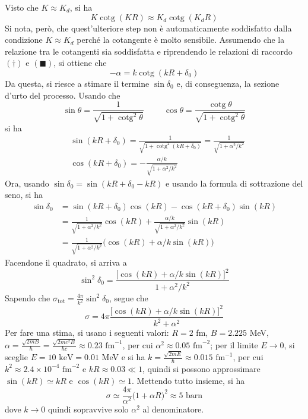 \documentclass[11pt, a4paper]{scrartcl}
\theoremstyle{style}
\numberwithin{equation}{subsection}
\begin{document}
\noindent Visto che $K \approx K_d$, si ha
\[
K \operatorname{cotg}  (K R)\approx K_d \operatorname{cotg} (K_dR)
\] 
Si nota, per\`o, che quest'ulteriore step non \`e automaticamente soddisfatto dalla condizione $K \approx K_d$ perch\'e la cotangente \`e molto sensibile.
Assumendo che la relazione tra le cotangenti sia soddisfatta e riprendendo le relazioni di raccordo $(\dagger )$ e $(\blacksquare)$, si ottiene che 
\begin{equation}
	- \alpha  = k \operatorname{cotg} (kR+\delta _0) \tag{$\star$}
\end{equation}
Da questa, si riesce a stimare il termine $\sin \delta _0$ e, di conseguenza, la sezione d'urto del processo.
Usando che
\[
\sin \theta  = \frac{1}{\sqrt{1 + \operatorname{cotg}^2 \theta  } } \hspace{1cm} \cos \theta  = \frac{\operatorname{cotg}\theta  }{\sqrt{1 + \operatorname{cotg}^2 \theta  } }
\] 
si ha
\[
	\begin{split}
		&\sin (kR +\delta _0) = \frac{1}{\sqrt{1 + \operatorname{cotg}^2 (kR+\delta _0) } } =  \frac{1}{\sqrt{1+ \alpha ^2 / k^2} }\\
		&\cos (kR +\delta _0) =- \frac{\alpha  / k}{\sqrt{1 + \alpha ^2 / k^2} }
	\end{split}
\] 
Ora, usando $\sin \delta _0 = \sin(kR + \delta _0 - kR)$ e usando la formula di sottrazione del seno, si ha
\[
	\begin{split}
		\sin \delta _0  &= \sin(kR+\delta _0) \cos(kR) - \cos (kR+\delta _0)\sin(kR)\\
				&= \frac{1}{\sqrt{1+\alpha ^2 / k^2} } \cos(kR) + \frac{\alpha  / k}{\sqrt{1 + \alpha ^2 / k^2} } \sin(kR)\\
				&= \frac{1}{\sqrt{1 + \alpha ^2 / k^2} } \Big(\cos (kR) + \alpha/k \sin(kR) \Big) 
	\end{split}
\] 
Facendone il quadrato, si arriva a 
\begin{equation*}
	\sin^2 \delta _0 = \frac{\big[\cos (kR) + \alpha  / k \sin(kR)\big]^2}{1 + \alpha ^2 / k^2}
\end{equation*}
Sapendo che $\sigma _\text{tot} = \frac{4\pi }{k^2} \sin ^2 \delta _0$, segue che
\begin{equation}
	\sigma  = 4 \pi \frac{\big[\cos (kR) + \alpha  / k \sin(kR)\big]^2}{k^2 + \alpha ^2}
\end{equation}
Per fare una stima, si usano i seguenti valori: $R = 2$ fm, $B = 2.225 $ MeV, $\alpha  = \frac{\sqrt{2mB} }{\hbar }= \frac{\sqrt{2m c^2 B} }{\hbar c} \approx 0.23 \text{ fm}^{-1}$, per cui $\alpha ^2 \approx 0.05 \text{ fm}^{-2}$; per il limite $E\to 0$, si sceglie $E = 10 \text{ keV} =0.01$ MeV e si ha $k = \frac{\sqrt{2 m E} }{\hbar } \approx 0.015\text{ fm}^{-1}$, per cui $k^2 \approx 2.4 \times 10 ^{-4}\text{ fm}^{-2}$ e $kR\approx 0.03 \ll 1$, quindi si possono approssimare $\sin (kR) \simeq kR$ e $\cos (kR) \simeq 1$.
Mettendo tutto insieme, si ha 
\[
\sigma \simeq \frac{4\pi}{\alpha ^2} \Big(1 + \alpha R\Big)^2 \approx 5 \text{ barn}
\] 
dove $k\to 0$ quindi sopravvive solo $\alpha^2 $  al denominatore. 
\end{document}
